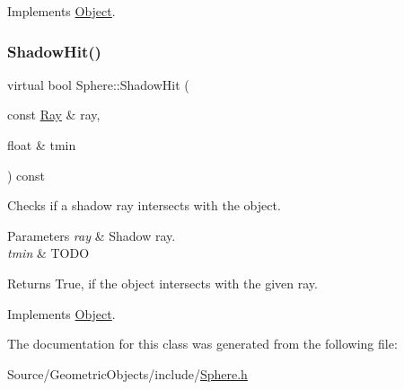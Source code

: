 Implements \hyperlink{class_object_ad9977e40c0a3048eba9a81b25efcf3ef}{Object}.

\hypertarget{class_sphere_ac3b3cc027f0cd8c89cecc3b65799267d}{}\label{class_sphere_ac3b3cc027f0cd8c89cecc3b65799267d} 
\subsubsection{\texorpdfstring{Shadow\+Hit()}{ShadowHit()}}
{\footnotesize\ttfamily virtual bool Sphere\+::\+Shadow\+Hit (\begin{DoxyParamCaption}\item[{const \hyperlink{class_ray}{Ray} \&}]{ray,  }\item[{float \&}]{tmin }\end{DoxyParamCaption}) const\hspace{0.3cm}{\ttfamily [virtual]}}

Checks if a shadow ray intersects with the object. 
\begin{DoxyParams}{Parameters}
{\em ray} & Shadow ray. \\
\hline
{\em tmin} & T\+O\+DO \\
\hline
\end{DoxyParams}
\begin{DoxyReturn}{Returns}
True, if the object intersects with the given ray. 
\end{DoxyReturn}


Implements \hyperlink{class_object_a020a6edbef7b2591b1dd6815ebbc5aa0}{Object}.



The documentation for this class was generated from the following file\+:\begin{DoxyCompactItemize}
\item 
Source/\+Geometric\+Objects/include/\hyperlink{_sphere_8h}{Sphere.\+h}\end{DoxyCompactItemize}
